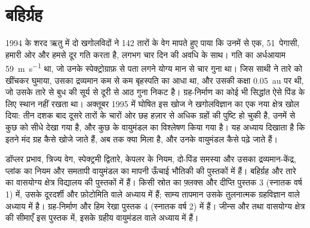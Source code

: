 \chapter{बहिर्ग्रह}\label{ch:b3:exoplanets}

1994 के शरद ऋतु में दो खगोलविदों ने 142
तारों के वेग मापते हुए पाया कि उनमें से एक, 51~पेगासी,
हमारी ओर और हमसे दूर गति करता है, लगभग चार दिन की अवधि के साथ। गति का अर्धआयाम
\qty{59}{m.s^{-1}} था, जो उनके स्पेक्ट्रोग्राफ़ से पता लगने योग्य मान से चार गुना था।
जिस साथी ने तारे को खींचकर घुमाया, उसका द्रव्यमान कम से कम
बृहस्पति का आधा था, और उसकी कक्षा \qty{0.05}{au} पर थी, जो उसके तारे से
बुध की सूर्य से दूरी से आठ गुना निकट है। ग्रह-निर्माण का कोई भी सिद्धांत
ऐसे पिंड के लिए स्थान नहीं रखता था। अक्तूबर 1995 में घोषित इस खोज ने खगोलविज्ञान का एक नया क्षेत्र खोल दिया:
तीन दशक बाद दूसरे तारों के चारों ओर छह हज़ार से अधिक ग्रहों की पुष्टि हो चुकी है,
उनमें से कुछ को सीधे देखा गया है, और कुछ के वायुमंडल का विश्लेषण किया गया है।
यह अध्याय दिखाता है कि इतने मंद ग्रह
कैसे खोजे जाते हैं, अब तक क्या मिला है,
और उनके वायुमंडल कैसे पढ़े जाते हैं।

\begin{recall}
डॉप्लर प्रभाव, त्रिज्य वेग, स्पेक्ट्रमी द्वितारे, केपलर के
नियम, दो-पिंड समस्या और उसका द्रव्यमान-केंद्र, प्लांक का नियम और
समतापी वायुमंडल का मापनी ऊँचाई भौतिकी की पुस्तकों में हैं।
बहिर्ग्रह और तारे का वासयोग्य क्षेत्र विद्यालय की पुस्तकों में हैं।
किसी स्रोत का फ़्लक्स और दीप्ति पुस्तक 3 (स्नातक वर्ष 1) में, उसके दूरदर्शी और फ़ोटोमिति वाले
अध्याय में हैं; साम्य तापमान उसके तुलनात्मक ग्रहविज्ञान वाले अध्याय में है।
ग्रह-निर्माण और हिम रेखा पुस्तक 4 (स्नातक वर्ष 2) में हैं।
जीन्स और  तथा वासयोग्य क्षेत्र की सीमाएँ
इस पुस्तक में, इसके ग्रहीय वायुमंडल वाले अध्याय में
हैं।
\end{recall}

